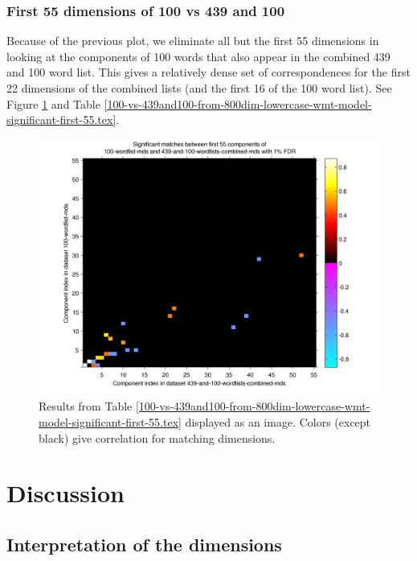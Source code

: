 \documentclass[10pt,letterpaper]{book}
\begin{document}
\subsection{First 55 dimensions of 100 vs 439 and 100}

Because of the previous plot, we eliminate all but the first 55 dimensions in
looking at the components of 100 words that also appear in the combined 439
and 100 word list. This gives a relatively dense set of correspondences for the
first 22 dimensions of the combined lists (and the first 16 of the 100 word
list). See Figure \ref{fig:100vs439And100First55} and Table 
\ref{100-vs-439and100-from-800dim-lowercase-wmt-model-significant-first-55.tex}.



\begin{figure}[!tbp]
    \includegraphics[width=0.9\linewidth]{100-vs-439and100-from-800dim-lowercase-wmt-model-significant-first-55}
    \caption{Results from Table 
    \ref{100-vs-439and100-from-800dim-lowercase-wmt-model-significant-first-55.tex} 
    displayed as an image. Colors (except black) give correlation for matching 
    dimensions.}
    \label{fig:100vs439And100First55}
\end{figure}


\chapter{Discussion}

\section{Interpretation of the dimensions}
\end{document}
